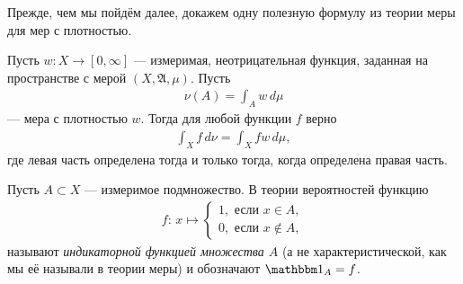 \documentclass[../main.tex]{subfiles}
\begin{document}
Прежде, чем мы пойдём далее, докажем одну полезную формулу из теории меры для мер с плотностью.

\begin{thm}
\label{theorem:integral_on_measure_with_density}
Пусть $ w \colon X \to [0,\infty] $ --- измеримая, неотрицательная функция, заданная на пространстве с мерой $ (X,\mathfrak A,\mu) $. Пусть
 \begin{align*}
  \nu(A) = \int_{A} w\,d\mu 
 \end{align*} --- мера с плотностью $ w $. Тогда для любой функции $ f $ верно
 \begin{align}
  \label{equation:integral_on_measure_with_density}
  \int_{X} f\,d\nu = \int_{X} f w \, d\mu,
 \end{align} где левая часть определена тогда и только тогда, когда определена правая часть.
\end{thm}
\begin{conventn*}
 Пусть $ A \subset X $ --- измеримое подмножество. В теории вероятностей функцию
 \begin{align*}
  f \colon\, x \mapsto \begin{cases}
   1, \text{ если } x \in A, \\
   0, \text{ если } x \notin A,
  \end{cases} 
 \end{align*} называют \textit{индикаторной функцией множества $ A $} (а не характеристической, как мы её называли в теории меры) и обозначают $ \Ind_A = f $.
\end{conventn*}
\end{document}
